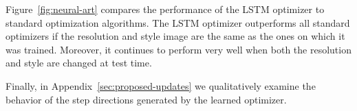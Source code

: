 Figure~\ref{fig:neural-art} compares the performance of the LSTM optimizer to
standard optimization algorithms.  The LSTM optimizer outperforms all standard
optimizers if the resolution and style image are the same as the ones on which
it was trained.  Moreover, it continues to perform very well when both the
resolution and style are changed at test time.

Finally, in Appendix~\ref{sec:proposed-updates} we qualitatively examine the
behavior of the step directions generated by the learned optimizer.



